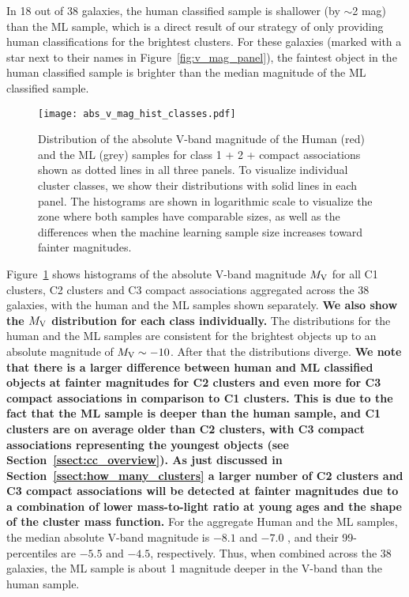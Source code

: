 \documentclass[linenumbers]{aastex63}
\begin{document}
In 18 out of 38 galaxies, the human classified sample is shallower (by $\sim$2 mag) than the ML sample, which is a direct result of our strategy of only providing human classifications for the brightest clusters. %
For these galaxies (marked with a star next to their names in Figure~\ref{fig:v_mag_panel}), the faintest object in the human classified sample is brighter than the median magnitude of the ML classified sample. 
%
\begin{figure} 
\texttt{[image: abs\_v\_mag\_hist\_classes.pdf]}
 \caption{Distribution of the absolute V-band magnitude of the Human (red) and the ML (grey) samples for class 1 + 2 + compact associations shown as dotted lines in all three panels. To visualize individual cluster classes, we show their distributions with solid lines in each panel. The histograms are shown in logarithmic scale to visualize the zone where both samples have comparable sizes, as well as the differences when the machine learning sample size increases toward fainter magnitudes. }%
 \label{fig:v_abs_mag}
\end{figure}
%

Figure~\ref{fig:v_abs_mag} shows histograms of the absolute V-band magnitude $M_{\rm V}$ for all C1 clusters, C2 clusters and C3 compact associations aggregated across the 38 galaxies, with the human and the ML samples shown separately. \textbf{We also show the $M_{\rm V}$ distribution for each class individually.} The distributions for the human and the ML samples are consistent for the brightest objects up to an absolute magnitude of $M_{\rm V} \sim -10$. After that the distributions diverge.
\textbf{We note that there is a larger difference between human and ML classified objects at fainter magnitudes for C2 clusters and even more for C3 compact associations in comparison to C1 clusters. 
This is due to the fact that the ML sample is deeper than the human sample, and C1 clusters are on average older than C2 clusters, with C3 compact associations representing the youngest objects (see Section~\ref{ssect:cc_overview}). As just discussed in Section~\ref{ssect:how_many_clusters} a larger number of C2 clusters and C3 compact associations will be detected at fainter magnitudes due to a combination of lower mass-to-light ratio at young ages and the shape of the cluster mass function.}
For the aggregate Human and the ML samples, the median absolute V-band magnitude is $-8.1$ and $-7.0$ , and their 99-percentiles are $-5.5$ and $-4.5$, respectively. Thus, when combined across the 38 galaxies, the ML sample is about 1 magnitude deeper in the V-band than the human sample.
\end{document}
